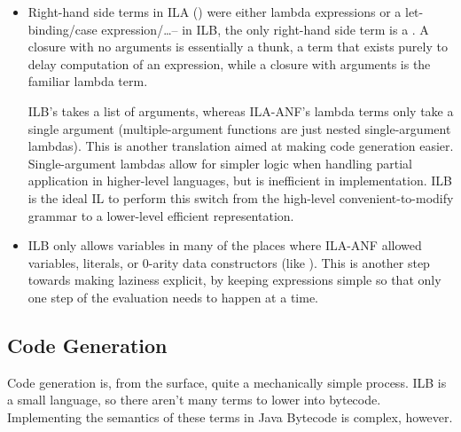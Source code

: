 \documentclass[dissertation.tex]{subfiles}
\begin{document}
{{{\begin{itemize}
{                

            }
            \item
            {

                Right-hand side terms in ILA () were either lambda expressions or a let-binding/case
                expression/\dots -- in ILB, the only right-hand side term is a . A closure with no
                arguments is essentially a thunk, a term that exists purely to delay computation of an expression, while
                a closure with arguments is the familiar lambda term.

                ILB's  takes a list of arguments, whereas ILA-ANF's lambda terms only take a single
                argument (multiple-argument functions are just nested single-argument lambdas). This is another
                translation aimed at making code generation easier. Single-argument lambdas allow for simpler logic when
                handling partial application in higher-level languages, but is inefficient in implementation. ILB is the
                ideal IL to perform this switch from the high-level convenient-to-modify grammar to a lower-level
                efficient representation.

            }
            \item
            {

                ILB only allows variables in many of the places where ILA-ANF allowed variables, literals, or 0-arity
                data constructors (like ). This is another step towards making laziness explicit, by
                keeping expressions simple so that only one step of the evaluation needs to happen at a time.

            }
            \end{itemize}

        }
    }
    \subsection{Code Generation}
    {
        
        Code generation is, from the surface, quite a mechanically simple process. ILB is a small language, so there
        aren't many terms to lower into bytecode. Implementing the semantics of these terms in Java Bytecode is complex,
        however.

}}
\end{document}
